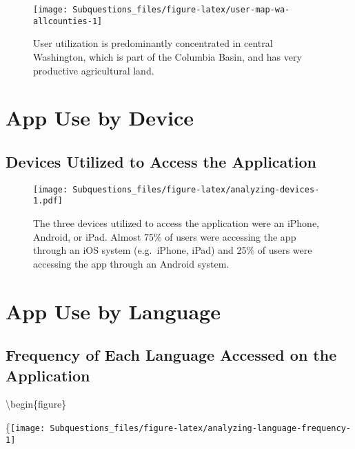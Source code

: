 \documentclass[
]{article}
\begin{document}
\begin{figure}
\texttt{[image: Subquestions\_files/figure-latex/user-map-wa-allcounties-1]} \caption{User utilization is predominantly concentrated in central Washington, which is part of the Columbia Basin, and has very productive agricultural land.}\label{fig:user-map-wa-allcounties}
\end{figure}

\newpage
\newpage

\hypertarget{app-use-by-device}{%
\section{App Use by Device}\label{app-use-by-device}}

\newpage
\newpage

\hypertarget{devices-utilized-to-access-the-application}{%
\subsection{Devices Utilized to Access the
Application}\label{devices-utilized-to-access-the-application}}

\begin{figure}
\centering
\texttt{[image: Subquestions\_files/figure-latex/analyzing-devices-1.pdf]}
\caption{The three devices utilized to access the application were an
iPhone, Android, or iPad. Almost 75\% of users were accessing the app
through an iOS system (e.g.~iPhone, iPad) and 25\% of users were
accessing the app through an Android system.}
\end{figure}

\newpage
\newpage

\hypertarget{app-use-by-language}{%
\section{App Use by Language}\label{app-use-by-language}}

\hypertarget{frequency-of-each-language-accessed-on-the-application}{%
\subsection{Frequency of Each Language Accessed on the
Application}\label{frequency-of-each-language-accessed-on-the-application}}

\textbackslash begin\{figure\}

\{\centering \texttt{[image: Subquestions\_files/figure-latex/analyzing-language-frequency-1]}
\end{document}
